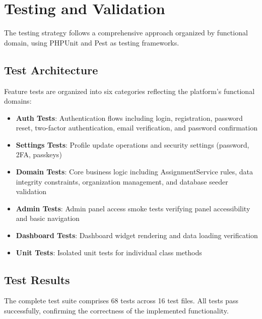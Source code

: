 \documentclass{bts-report}
\begin{document}

\section{Testing and Validation}

The testing strategy follows a comprehensive approach organized by functional domain, using PHPUnit and Pest as testing frameworks.

\subsection{Test Architecture}
Feature tests are organized into six categories reflecting the platform's functional domains:
\begin{itemize}
  \item \textbf{Auth Tests}: Authentication flows including login, registration, password reset, two-factor authentication, email verification, and password confirmation
  \item \textbf{Settings Tests}: Profile update operations and security settings (password, 2FA, passkeys)
  \item \textbf{Domain Tests}: Core business logic including AssignmentService rules, data integrity constraints, organization management, and database seeder validation
  \item \textbf{Admin Tests}: Admin panel access smoke tests verifying panel accessibility and basic navigation
  \item \textbf{Dashboard Tests}: Dashboard widget rendering and data loading verification
  \item \textbf{Unit Tests}: Isolated unit tests for individual class methods
\end{itemize}

\subsection{Test Results}

The complete test suite comprises 68 tests across 16 test files. All tests pass successfully, confirming the correctness of the implemented functionality.
\end{document}
